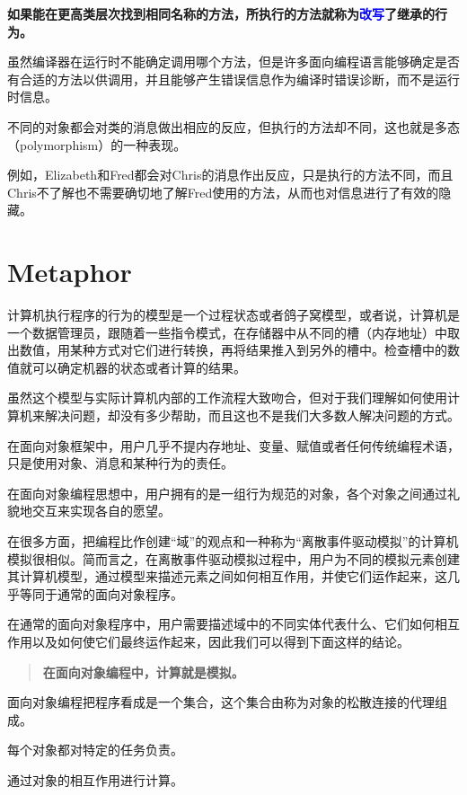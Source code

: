 \textbf{如果能在更高类层次找到相同名称的方法，所执行的方法就称为\textcolor{blue}{改写}了继承的行为。}

虽然编译器在运行时不能确定调用哪个方法，但是许多面向编程语言能够确定是否有合适的方法以供调用，并且能够产生错误信息作为编译时错误诊断，而不是运行时信息。

不同的对象都会对类的消息做出相应的反应，但执行的方法却不同，这也就是多态（polymorphism）的一种表现。

例如，Elizabeth和Fred都会对Chris的消息作出反应，只是执行的方法不同，而且Chris不了解也不需要确切地了解Fred使用的方法，从而也对信息进行了有效的隐藏。

\chapter{Metaphor}



计算机执行程序的行为的模型是一个过程状态或者鸽子窝模型，或者说，计算机是一个数据管理员，跟随着一些指令模式，在存储器中从不同的槽（内存地址）中取出数值，用某种方式对它们进行转换，再将结果推入到另外的槽中。检查槽中的数值就可以确定机器的状态或者计算的结果。

虽然这个模型与实际计算机内部的工作流程大致吻合，但对于我们理解如何使用计算机来解决问题，却没有多少帮助，而且这也不是我们大多数人解决问题的方式。

在面向对象框架中，用户几乎不提内存地址、变量、赋值或者任何传统编程术语，只是使用对象、消息和某种行为的责任。

在面向对象编程思想中，用户拥有的是一组行为规范的对象，各个对象之间通过礼貌地交互来实现各自的愿望。


在很多方面，把编程比作创建“域”的观点和一种称为“离散事件驱动模拟”的计算机模拟很相似。简而言之，在离散事件驱动模拟过程中，用户为不同的模拟元素创建其计算机模型，通过模型来描述元素之间如何相互作用，并使它们运作起来，这几乎等同于通常的面向对象程序。

在通常的面向对象程序中，用户需要描述域中的不同实体代表什么、它们如何相互作用以及如何使它们最终运作起来，因此我们可以得到下面这样的结论。

\begin{quote}
\textbf{在面向对象编程中，计算就是模拟。}
\end{quote}

面向对象编程把程序看成是一个集合，这个集合由称为对象的松散连接的代理组成。

\begin{compactitem}
\item 每个对象都对特定的任务负责。
\item 通过对象的相互作用进行计算。
\end{compactitem}

